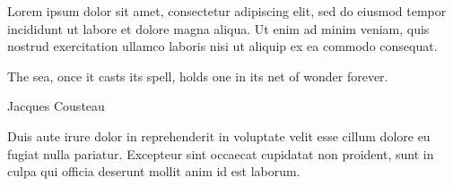 \documentclass[11pt,oneside]{memoir}
\begin{document}
Lorem ipsum dolor sit amet, consectetur adipiscing elit, sed do eiusmod tempor incididunt ut labore et dolore magna aliqua. Ut enim ad minim veniam, quis nostrud exercitation ullamco laboris nisi ut aliquip ex ea commodo consequat.

\epigraph{The sea, once it casts its spell, holds one in its net of wonder forever.}{Jacques Cousteau}

Duis aute irure dolor in reprehenderit in voluptate velit esse cillum dolore eu fugiat nulla pariatur. Excepteur sint occaecat cupidatat non proident, sunt in culpa qui officia deserunt mollit anim id est laborum.
\end{document}
